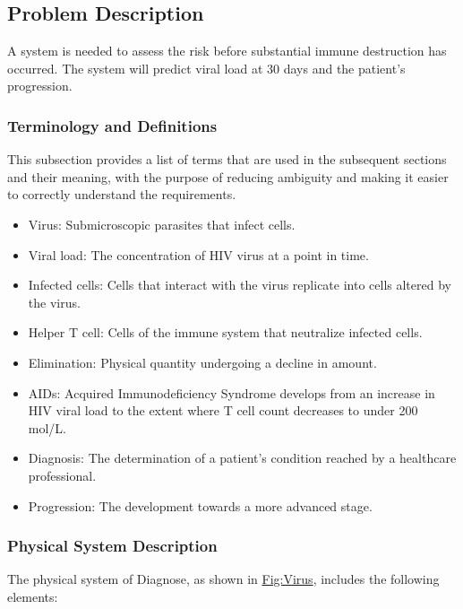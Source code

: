 \documentclass[12pt]{article}
\begin{document}
\subsection{Problem Description}
\label{Sec:ProbDesc}
A system is needed to assess the risk before substantial immune destruction has occurred. The system will predict viral load at 30 days and the patient's progression.

\subsubsection{Terminology and Definitions}
\label{Sec:TermDefs}
This subsection provides a list of terms that are used in the subsequent sections and their meaning, with the purpose of reducing ambiguity and making it easier to correctly understand the requirements.

\begin{itemize}
\item{Virus: Submicroscopic parasites that infect cells.}
\item{Viral load: The concentration of HIV virus at a point in time.}
\item{Infected cells: Cells that interact with the virus replicate into cells altered by the virus.}
\item{Helper T cell: Cells of the immune system that neutralize infected cells.}
\item{Elimination: Physical quantity undergoing a decline in amount.}
\item{AIDs: Acquired Immunodeficiency Syndrome develops from an increase in HIV viral load to the extent where T cell count decreases to under 200 mol/L.}
\item{Diagnosis: The determination of a patient's condition reached by a healthcare professional.}
\item{Progression: The development towards a more advanced stage.}
\end{itemize}
\subsubsection{Physical System Description}
\label{Sec:PhysSyst}
The physical system of Diagnose, as shown in \hyperref[Figure:Virus]{Fig:Virus}, includes the following elements:
\end{document}
